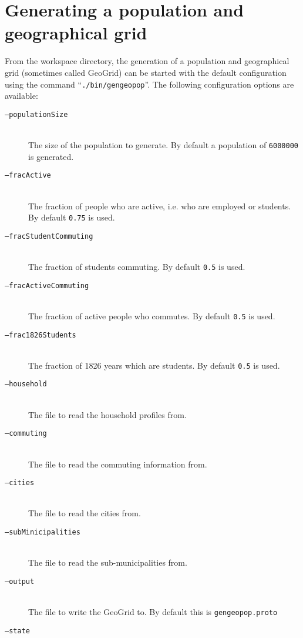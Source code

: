 \section{Generating a population and geographical grid}


From the workspace directory, the generation of a population and geographical grid (sometimes called GeoGrid) can be started with the default configuration using the command \mbox{``\texttt{./bin/gengeopop}''}. The following configuration options are available:

\begin{description}
    \item[\texttt{--populationSize}] \ \\
        The size of the population to generate. By default a population of \texttt{6000000} is generated.
    \item[\texttt{--fracActive}] \ \\
        The fraction of people who are active, i.e. who are employed or students. By default \texttt{0.75} is used.
    \item[\texttt{--fracStudentCommuting}] \ \\
        The fraction of students commuting. By default \texttt{0.5} is used.
    \item[\texttt{--fracActiveCommuting}] \ \\
        The fraction of active people who commutes. By default \texttt{0.5} is used.
    \item[\texttt{--frac1826Students}] \ \\
        The fraction of 1826 years which are students. By default \texttt{0.5} is used.
    \item[\texttt{--household}] \ \\
        The file to read the household profiles from.
    \item[\texttt{--commuting}] \ \\
        The file to read the commuting information from.
    \item[\texttt{--cities}] \ \\
        The file to read the cities from.
    \item[\texttt{--subMinicipalities}] \ \\
        The file to read the sub-municipalities from.
    \item[\texttt{--output}] \ \\
        The file to write the GeoGrid to. By default this is \texttt{gengeopop.proto}
    \item[\texttt{--state}] \ \\

\end{description}
